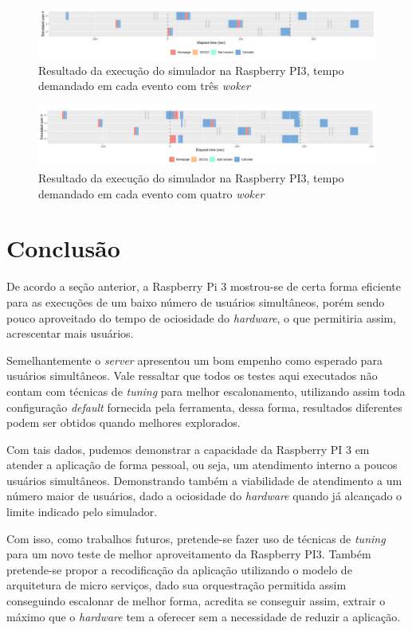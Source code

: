 \documentclass[12pt,english,brazil]{article}
\begin{document}
\begin{figure}[htbp]
  \centering 
  \includegraphics[scale=.4]{paperWSCAD2021/figures/user_PI3_3_worker.png}
  \caption{Resultado da execução do simulador na Raspberry PI3, tempo demandado em cada evento com três \emph{woker}}
  \label{PI3_3wroker}
\end{figure}

\begin{figure}[htbp]
  \centering 
  \includegraphics[scale=.4]{paperWSCAD2021/figures/user_PI3_4_worker.png}
  \caption{Resultado da execução do simulador na Raspberry PI3, tempo demandado em cada evento com quatro \emph{woker}}
  \label{PI3_4wroker}
\end{figure}

\section{Conclusão} \label{sec:conlusao}
De acordo a seção anterior, a Raspberry Pi 3 mostrou-se de certa forma eficiente para as execuções de um baixo número de usuários simultâneos, porém sendo pouco aproveitado do tempo de ociosidade do \emph{hardware}, o que permitiria assim, acrescentar mais usuários. 

Semelhantemente o \emph{server} apresentou um bom empenho como esperado para usuários simultâneos. Vale ressaltar que todos os testes aqui executados não contam com técnicas de \emph{tuning} para melhor escalonamento, utilizando assim toda configuração \emph{default} fornecida pela ferramenta, dessa forma, resultados diferentes podem ser obtidos quando melhores explorados.

Com tais dados, pudemos demonstrar a capacidade da Raspberry PI 3 em atender a aplicação de forma pessoal, ou seja, um atendimento interno a poucos usuários simultâneos. Demonstrando também a viabilidade de atendimento a um número maior de usuários, dado a ociosidade do \emph{hardware} quando já alcançado o limite indicado pelo simulador.

Com isso, como trabalhos futuros, pretende-se fazer uso de técnicas de \emph{tuning} para um novo teste de melhor aproveitamento da Raspberry PI3. Também pretende-se propor a recodificação da aplicação utilizando o modelo de arquitetura de micro serviços, dado sua orquestração permitida assim conseguindo escalonar de melhor forma, acredita se conseguir assim, extrair o máximo que o \emph{hardware} tem a oferecer sem a necessidade de reduzir a aplicação. 




\end{document}
